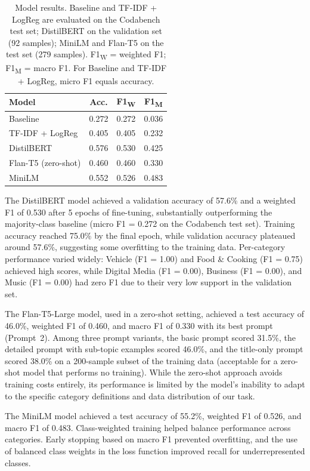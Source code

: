 \documentclass[11pt]{article}
\begin{document}
\begin{table}[t]
\centering
\small
\begin{tabular}{@{}lccc@{}}
\toprule
\textbf{Model} & \textbf{Acc.} & \textbf{F1\textsubscript{W}} & \textbf{F1\textsubscript{M}} \\
\midrule
Baseline & 0.272 & 0.272 & 0.036 \\
TF-IDF + LogReg & 0.405 & 0.405 & 0.232 \\
DistilBERT & 0.576 & 0.530 & 0.425 \\
Flan-T5 (zero-shot) & 0.460 & 0.460 & 0.330 \\
MiniLM & 0.552 & 0.526 & 0.483 \\
\bottomrule
\end{tabular}
\caption{Model results. Baseline and TF-IDF + LogReg are evaluated on the Codabench test set; DistilBERT on the validation set (92 samples); MiniLM and Flan-T5 on the test set (279 samples). F1\textsubscript{W} = weighted F1; F1\textsubscript{M} = macro F1. For Baseline and TF-IDF + LogReg, micro F1 equals accuracy.}
\label{tab:results}
\end{table}

The DistilBERT model achieved a validation accuracy of 57.6\% and a weighted F1 of 0.530 after 5 epochs of fine-tuning, substantially outperforming the majority-class baseline (micro F1 = 0.272 on the Codabench test set). Training accuracy reached 75.0\% by the final epoch, while validation accuracy plateaued around 57.6\%, suggesting some overfitting to the training data. Per-category performance varied widely: Vehicle (F1 = 1.00) and Food \& Cooking (F1 = 0.75) achieved high scores, while Digital Media (F1 = 0.00), Business (F1 = 0.00), and Music (F1 = 0.00) had zero F1 due to their very low support in the validation set.

The Flan-T5-Large model, used in a zero-shot setting, achieved a test accuracy of 46.0\%, weighted F1 of 0.460, and macro F1 of 0.330 with its best prompt (Prompt~2). Among three prompt variants, the basic prompt scored 31.5\%, the detailed prompt with sub-topic examples scored 46.0\%, and the title-only prompt scored 38.0\% on a 200-sample subset of the training data (acceptable for a zero-shot model that performs no training). While the zero-shot approach avoids training costs entirely, its performance is limited by the model's inability to adapt to the specific category definitions and data distribution of our task.

The MiniLM model achieved a test accuracy of 55.2\%, weighted F1 of 0.526, and macro F1 of 0.483. Class-weighted training helped balance performance across categories. Early stopping based on macro F1 prevented overfitting, and the use of balanced class weights in the loss function improved recall for underrepresented classes.
\end{document}
